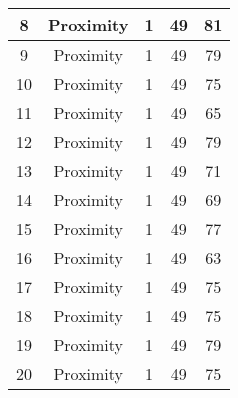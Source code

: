 \documentclass[results.tex]{subfiles}
\begin{document}
\begin{center}
\begin{tabular}{| c || c | c | c | c |}
            \hline
            8                       & Proximity                    & 1                      & 49                      & 81                   \\
            \hline
            9                       & Proximity                    & 1                      & 49                      & 79                   \\
            \hline
            10                      & Proximity                    & 1                      & 49                      & 75                   \\
            \hline
            11                      & Proximity                    & 1                      & 49                      & 65                   \\
            \hline
            12                      & Proximity                    & 1                      & 49                      & 79                   \\
            \hline
            13                      & Proximity                    & 1                      & 49                      & 71                   \\
            \hline
            14                      & Proximity                    & 1                      & 49                      & 69                   \\
            \hline
            15                      & Proximity                    & 1                      & 49                      & 77                   \\
            \hline
            16                      & Proximity                    & 1                      & 49                      & 63                   \\
            \hline
            17                      & Proximity                    & 1                      & 49                      & 75                   \\
            \hline
            18                      & Proximity                    & 1                      & 49                      & 75                   \\
            \hline
            19                      & Proximity                    & 1                      & 49                      & 79                   \\
            \hline
            20                      & Proximity                    & 1                      & 49                      & 75                   \\

\end{tabular}
\end{center}
\end{document}
